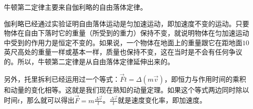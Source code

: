 \begin{prove}
    牛顿第二定律主要来自伽利略的自由落体定律。
    
    伽利略已经通过实验证明自由落体运动是匀加速运动，即加速度不变的运动。只要物体在自由下落时它的重量（所受到的重力）保持不变，就说明物体在匀加速运动中受到的作用力是恒定不变的。如果说，一个物体在地面上的重量跟它在距地面$10$英尺高处的重量一样或基本一样，质量也保持不变，这在当时是不会有任何争议的。所以，牛顿第二定律是从自由落体定律延伸出来的。
    
    另外，托里拆利已经运用过一个等式：$\vec{F}t=\Delta (m\vec{v})$，即恒力与作用时间的乘积和动量的变化相等。这就是我们现在熟知的动量定理。如果这个等式两边同时除以时间$t$，那么就可以得出$\displaystyle \vec{F}=m\frac{\Delta \vec{v}}{t}$。$\displaystyle\frac{\Delta \vec{v}}{t}$就是速度变化率，即加速度。
\end{prove}

